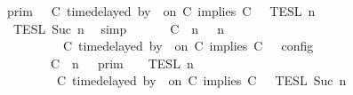 \begin{isabellebody}
\ \ \ \ \ \ \ \ \ {\isacharequal}\ {\isasymlbrakk}{\isasymlbrakk}\ {\isasymGamma}\ {\isasymrbrakk}{\isasymrbrakk}\isactrlsub p\isactrlsub r\isactrlsub i\isactrlsub m\ {\isasyminter}\ {\isasymlbrakk}{\isasymlbrakk}\ {\isacharparenleft}C\ time{\isacharminus}delayed\ by\ {\isasymdelta}{\isasymtau}\ on\ C\ implies\ C\ {\isacharhash}\ {\isasymPsi}\ {\isasymrbrakk}{\isasymrbrakk}\isactrlsub T\isactrlsub E\isactrlsub S\isactrlsub L\isactrlbsup {\isasymge}\ n\isactrlesup \isanewline
\ \ \ \ \ \ \ \ \ \ {\isasyminter}\ {\isasymlbrakk}{\isasymlbrakk}\ {\isasymPhi}\ {\isasymrbrakk}{\isasymrbrakk}\isactrlsub T\isactrlsub E\isactrlsub S\isactrlsub L\isactrlbsup {\isasymge}\ Suc\ n\isactrlesup {\isacartoucheclose}\ \isamarkupfalse%
\ simp\isanewline
\ \ \isamarkupfalse%
\ \isamarkupfalse%
\ {\isacartoucheopen}{\isasymlbrakk}\ {\isacharparenleft}{\isacharparenleft}C\ {\isasymnot}{\isasymUp}\ n{\isacharparenright}\ {\isacharhash}\ {\isasymGamma}{\isacharparenright}{\isacharcomma}\ n\isanewline
\ \ \ \ \ \ \ \ \ \ \ \ \ \ \ \ \ \ {\isasymturnstile}\ {\isasymPsi}\ {\isasymtriangleright}\ {\isacharparenleft}{\isacharparenleft}C\ time{\isacharminus}delayed\ by\ {\isasymdelta}{\isasymtau}\ on\ C\ implies\ C\ {\isacharhash}\ {\isasymPhi}{\isacharparenright}\ {\isasymrbrakk}\isactrlsub c\isactrlsub o\isactrlsub n\isactrlsub f\isactrlsub i\isactrlsub g\isanewline
\ \ \ \ \ \ \ \ \ \ \ \ \ \ \ \ \ {\isacharequal}\ {\isasymlbrakk}{\isasymlbrakk}\ {\isacharparenleft}C\ {\isasymnot}{\isasymUp}\ n{\isacharparenright}\ {\isacharhash}\ {\isasymGamma}\ {\isasymrbrakk}{\isasymrbrakk}\isactrlsub p\isactrlsub r\isactrlsub i\isactrlsub m\ {\isasyminter}\ {\isasymlbrakk}{\isasymlbrakk}\ {\isasymPsi}\ {\isasymrbrakk}{\isasymrbrakk}\isactrlsub T\isactrlsub E\isactrlsub S\isactrlsub L\isactrlbsup {\isasymge}\ n\isactrlesup \isanewline
\ \ \ \ \ \ \ \ \ \ \ \ \ \ \ \ \ \ {\isasyminter}\ {\isasymlbrakk}{\isasymlbrakk}\ {\isacharparenleft}C\ time{\isacharminus}delayed\ by\ {\isasymdelta}{\isasymtau}\ on\ C\ implies\ C\ {\isacharhash}\ {\isasymPhi}\ {\isasymrbrakk}{\isasymrbrakk}\isactrlsub T\isactrlsub E\isactrlsub S\isactrlsub L\isactrlbsup {\isasymge}\ Suc\ n\isactrlesup {\isacartoucheclose}\isanewline

\end{isabellebody}
